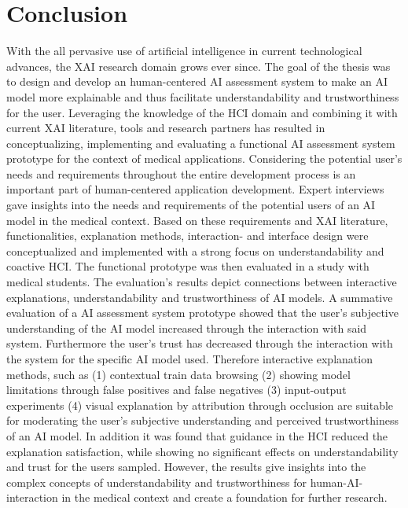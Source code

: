 \documentclass[11pt,a4paper,english]{scrreprt}
\begin{document}
\chapter{Conclusion}
With the all pervasive use of artificial intelligence in current technological advances, the XAI research domain grows ever since. The goal of the thesis was to design and develop an human-centered AI assessment system to make an AI model more explainable and thus facilitate understandability and trustworthiness for the user. Leveraging the knowledge of the HCI domain and combining it with current XAI literature, tools and research partners has resulted in conceptualizing, implementing and evaluating a functional AI assessment system prototype for the context of medical applications. Considering the potential user's needs and requirements throughout the entire development process is an important part of human-centered application development. Expert interviews gave insights into the needs and requirements of the potential users of an AI model in the medical context. Based on these requirements and XAI literature, functionalities, explanation methods, interaction- and interface design were conceptualized and implemented with a strong focus on understandability and coactive HCI. The functional prototype was then evaluated in a study with medical students. The evaluation's results depict connections between interactive explanations, understandability and trustworthiness of AI models. A summative evaluation of a AI assessment system prototype showed that the user's subjective understanding of the AI model increased through the interaction with said system. Furthermore the user's trust has decreased through the interaction with the system for the specific AI model used. Therefore interactive explanation methods, such as (1) contextual train data browsing (2) showing model limitations through false positives and false negatives (3) input-output experiments (4) visual explanation by attribution through occlusion are suitable for moderating the user's subjective understanding and perceived trustworthiness of an AI model. In addition it was found that guidance in the HCI reduced the explanation satisfaction, while showing no significant effects on understandability and trust for the users sampled. However, the results give insights into the complex concepts of understandability and trustworthiness for human-AI-interaction in the medical context and create a foundation for further research.

\clearpage

\end{document}
